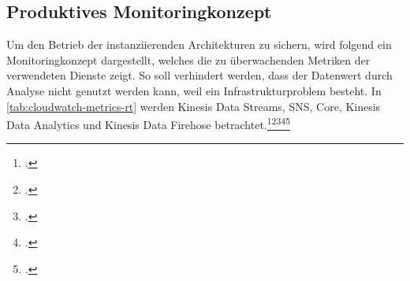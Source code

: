 \subsection{Produktives Monitoringkonzept} \label{chap:echtzeit_ops}
Um den Betrieb der instanziierenden Architekturen zu sichern, wird folgend ein Monitoringkonzept dargestellt, welches die zu überwachenden Metriken der verwendeten Dienste zeigt. So soll verhindert werden, dass der Datenwert durch Analyse nicht genutzt werden kann, weil ein Infrastrukturproblem besteht.
In \autoref{tab:cloudwatch-metrics-rt} werden Kinesis Data Streams, \ac{SNS}, \AWSIOT{} Core, Kinesis Data Analytics und Kinesis Data Firehose betrachtet.\footcite[Vgl.][]{AmazonWebServicesInc..o.J.bb}\nzitat\footcite[Vgl.][]{AmazonWebServicesInc..o.J.bc}\nzitat\footcite[Vgl.][]{AmazonWebServicesInc..o.J.az}\nzitat\footcite[Vgl.][]{AmazonWebServicesInc..o.J.ay}\nzitat\footcite[Vgl.][]{AmazonWebServicesInc..o.J.bj}

